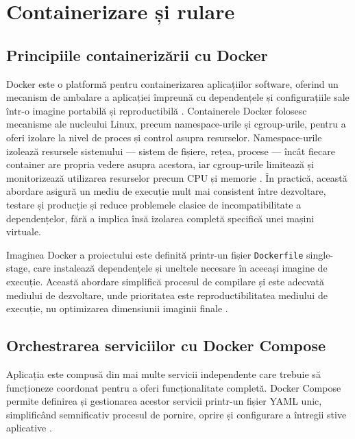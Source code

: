 \documentclass[12pt, a4paper, oneside, romanian]{teza-upb}
\begin{document}
\section{Containerizare și rulare}

\subsection{Principiile containerizării cu Docker}

Docker este o platformă pentru containerizarea aplicațiilor software, 
oferind un mecanism de ambalare a aplicației împreună cu dependențele 
și configurațiile sale într-o imagine portabilă și reproductibilă 
\cite{docker_doc}. Containerele Docker folosesc mecanisme ale nucleului Linux, precum namespace-urile și cgroup-urile, pentru a oferi izolare la nivel de proces și control asupra resurselor. Namespace-urile izolează resursele sistemului — sistem de fișiere, rețea, procese — încât fiecare container are propria 
vedere asupra acestora, iar cgroup-urile limitează și monitorizează utilizarea 
resurselor precum CPU și memorie \cite{docker_doc}. În practică, această abordare asigură un mediu de execuție mult mai consistent între dezvoltare, testare și producție și reduce problemele clasice de incompatibilitate a dependențelor, fără a implica însă izolarea completă specifică unei mașini virtuale.

Imaginea Docker a proiectului este definită printr-un fișier 
\texttt{Dockerfile} single-stage, care instalează dependențele și 
uneltele necesare în aceeași imagine de execuție. Această abordare 
simplifică procesul de compilare și este adecvată mediului de dezvoltare, 
unde prioritatea este reproductibilitatea mediului de execuție, nu 
optimizarea dimensiunii imaginii finale \cite{docker_doc}.

\subsection{Orchestrarea serviciilor cu Docker Compose}

Aplicația este compusă din mai multe servicii independente care trebuie să funcționeze coordonat pentru a oferi funcționalitate completă. Docker Compose permite definirea și gestionarea acestor servicii printr-un fișier YAML unic, simplificând semnificativ procesul de pornire, oprire și configurare a întregii stive aplicative \cite{docker_compose_doc}.
\end{document}
